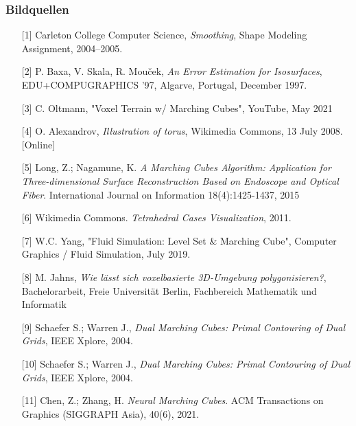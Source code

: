 \documentclass{beamer}
\begin{document}
\begin{frame}[t]
\frametitle{Bildquellen}
\scriptsize
\begin{itemize}
\item[{[1]}] Carleton College Computer Science, \emph{Smoothing}, Shape Modeling Assignment, 2004–2005.  
\item[{[2]}] P. Baxa, V. Skala, R. Mouček, \emph{An Error Estimation for Isosurfaces}, EDU+COMPUGRAPHICS '97, Algarve, Portugal, December 1997.  
\item[{[3]}] C. Oltmann, "Voxel Terrain w/ Marching Cubes", YouTube, May 2021
\item[{[4]}] O. Alexandrov, \emph{Illustration of torus}, Wikimedia Commons, 13 July 2008. [Online]
\item[{[5]}] Long, Z.; Nagamune, K. \emph{A Marching Cubes Algorithm: Application for Three-dimensional Surface Reconstruction Based on Endoscope and Optical Fiber}. International Journal on Information 18(4):1425-1437, 2015
\item[{[6]}] Wikimedia Commons. \emph{Tetrahedral Cases Visualization}, 2011.
\item[{[7]}] W.C. Yang, "Fluid Simulation: Level Set \& Marching Cube", Computer Graphics / Fluid Simulation, July 2019.
\item[{[8]}] M. Jahns, \emph{Wie lässt sich voxelbasierte 3D-Umgebung polygonisieren?}, Bachelorarbeit, Freie Universität Berlin, Fachbereich Mathematik und Informatik
\item[{[9]}] Schaefer S.; Warren J., \emph{Dual Marching Cubes: Primal Contouring of Dual Grids}, IEEE Xplore, 2004.
\item[{[10]}] Schaefer S.; Warren J., \emph{Dual Marching Cubes: Primal Contouring of Dual Grids}, IEEE Xplore, 2004.
\item[{[11]}] Chen, Z.; Zhang, H. \emph{Neural Marching Cubes}. ACM Transactions on Graphics (SIGGRAPH Asia), 40(6), 2021.
\end{itemize}
\end{frame}
\end{document}
